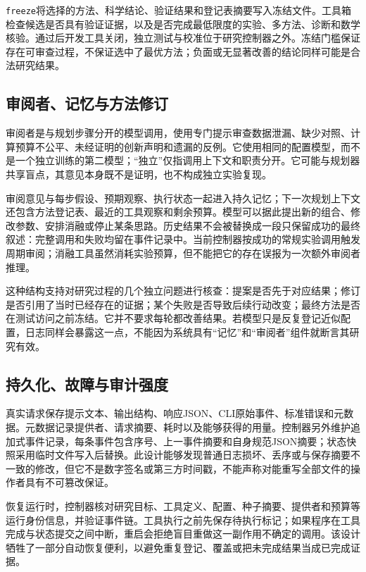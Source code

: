 \texttt{freeze}将选择的方法、科学结论、验证结果和登记表摘要写入冻结文件。工具箱检查候选是否具有验证证据，以及是否完成最低限度的实验、多方法、诊断和数学核验。通过后开发工具关闭，独立测试与校准位于研究控制器之外。冻结门槛保证存在可审查过程，不保证选中了最优方法；负面或无显著改善的结论同样可能是合法研究结果。

\subsection{审阅者、记忆与方法修订}

审阅者是与规划步骤分开的模型调用，使用专门提示审查数据泄漏、缺少对照、计算预算不公平、未经证明的创新声明和遗漏的反例。它使用相同的配置模型，而不是一个独立训练的第二模型；“独立”仅指调用上下文和职责分开。它可能与规划器共享盲点，其意见本身既不是证明，也不构成独立实验复现。

审阅意见与每步假设、预期观察、执行状态一起进入持久记忆；下一次规划上下文还包含方法登记表、最近的工具观察和剩余预算。模型可以据此提出新的组合、修改参数、安排消融或停止某条思路。历史结果不会被替换成一段只保留成功的最终叙述：完整调用和失败均留在事件记录中。当前控制器按成功的常规实验调用触发周期审阅；消融工具虽然消耗实验预算，但不能把它的存在误报为一次额外审阅者推理。

这种结构支持对研究过程的几个独立问题进行核查：提案是否先于对应结果；修订是否引用了当时已经存在的证据；某个失败是否导致后续行动改变；最终方法是否在测试访问之前冻结。它并不要求每轮都改善结果。若模型只是反复登记近似配置，日志同样会暴露这一点，不能因为系统具有“记忆”和“审阅者”组件就断言其研究有效。

\subsection{持久化、故障与审计强度}

真实请求保存提示文本、输出结构、响应JSON、CLI原始事件、标准错误和元数据。元数据记录提供者、请求摘要、耗时以及能够获得的用量。控制器另外维护追加式事件记录，每条事件包含序号、上一事件摘要和自身规范JSON摘要；状态快照采用临时文件写入后替换。此设计能够发现普通日志损坏、丢序或与保存摘要不一致的修改，但它不是数字签名或第三方时间戳，不能声称对能重写全部文件的操作者具有不可篡改保证。

恢复运行时，控制器核对研究目标、工具定义、配置、种子摘要、提供者和预算等运行身份信息，并验证事件链。工具执行之前先保存待执行标记；如果程序在工具完成与状态提交之间中断，重启会拒绝盲目重做这一副作用不确定的调用。该设计牺牲了一部分自动恢复便利，以避免重复登记、覆盖或把未完成结果当成已完成证据。

